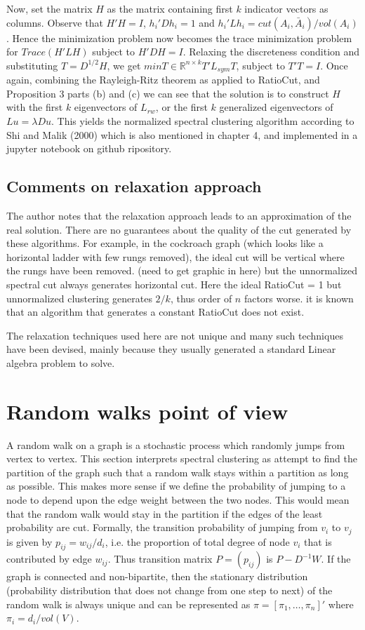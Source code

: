 \documentclass[10pt,a4paper, nocenter]{report}
\begin{document}
	Now, set the matrix $H$ as the matrix containing first $k$ indicator vectors as columns. Observe that $H'H=I$, $h_{i}'Dh_{i} = 1$ and $h_{i}'Lh_{i} = cut(A_{i},\bar{A}_{i})/vol(A_{i})$. Hence the minimization problem now becomes the trace minimization problem for $Trace(H'LH)$ subject to $H'DH=I$. Relaxing the discreteness condition and substituting $T = D^{1/2}H$, we get $min T\in \mathbb{R}^{n\times k}T'L_{sym}T$, subject to $T'T = I$. Once again, combining the Rayleigh-Ritz theorem as applied to RatioCut, and Proposition 3 parts (b) and (c) we can see that the solution is to construct $H$ with the first $k$ eigenvectors of $L_{rw}$, or the first $k$ generalized eigenvectors of $Lu=\lambda Du$. This yields the normalized spectral clustering algorithm according to Shi and Malik (2000) which is also mentioned in chapter 4, and implemented in a jupyter notebook on github ripository.
	 
	 \section{Comments on relaxation approach}
	 The author notes that the relaxation approach leads to an approximation of the real solution. There are no guarantees about the quality of the cut generated by these algorithms. For example, in the cockroach graph (which looks like a horizontal ladder with few rungs removed), the ideal cut will be vertical where the rungs have been removed. (need to get graphic in here) but the unnormalized spectral cut always generates horizontal cut. Here the ideal RatioCut = 1 but unnormalized clustering generates $2/k$, thus order of $n$ factors worse. it is known that an algorithm that generates a constant RatioCut does not exist. 
	 
	 The relaxation techniques used here are not unique and many such techniques have been devised, mainly because they usually generated a standard Linear algebra problem to solve. 
	
	\chapter{Random walks point of view}
	A random walk on a graph is a stochastic process which randomly jumps from vertex to vertex. This section interprets spectral clustering as attempt to find the partition of the graph such that a random walk stays within a partition as long as possible. This makes more sense if we define the probability of jumping to a node to depend upon the edge weight between the two nodes. This would mean that the random walk would stay in the partition if the edges of the least probability are cut. Formally, the transition probability of jumping from $v_{i}$ to $v_{j}$ is given by $p_{ij} = w_{ij}/d_{i}$, i.e. the proportion of total degree of node $v_{i}$ that is contributed by edge $w_{ij}$. Thus transition matrix $P = (p_{ij})$ is $P - D^{-1}W$. If the graph is connected and non-bipartite, then the stationary distribution (probability distribution that does not change from one step to next) of the random walk is always unique and can be represented as $\pi = [\pi_{1},\dots,\pi_{n}]'$ where $\pi_{i} = d_{i}/vol(V)$.
	
\end{document}
